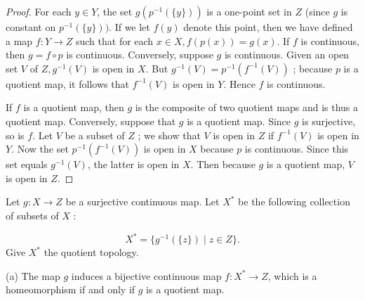 \begin{proof}
 For each \(y \in Y\), the set \(g( {p^{-1}( {\{ y\} }) })\) is a one-point set in \(Z\) (since \(g\) is constant on \(p^{-1}( {\{ y\} }) )\). If we let \(f( y)\) denote this point, then we have defined a map \(f : Y \rightarrow Z\) such that for each \(x \in X,f( {p(x) }) = g(x)\). If \(f\) is continuous, then \(g = f \circ p\) is continuous. Conversely, suppose \(g\) is continuous. Given an open set \(V\) of \(Z,g^{-1}( V)\) is open in \(X\). But \(g^{-1}( V) = p^{-1}( {f^{-1}( V) })\) ; because \(p\) is a quotient map, it follows that \(f^{-1}( V)\) is open in \(Y\). Hence \(f\) is continuous.

 If \(f\) is a quotient map, then \(g\) is the composite of two quotient maps and is thus a quotient map. Conversely, suppose that \(g\) is a quotient map. Since \(g\) is surjective, so is \(f\). Let \(V\) be a subset of \(Z\) ; we show that \(V\) is open in \(Z\) if \(f^{-1}( V)\) is open in \(Y\). Now the set \(p^{-1}( {f^{-1}( V) })\) is open in \(X\) because \(p\) is continuous. Since this set equals \(g^{-1}( V)\), the latter is open in \(X\). Then because \(g\) is a quotient map, \(V\) is open in \(Z\).
\end{proof}

\begin{corollary}
\label{cor:\thetheorem}
 Let \(g : X \rightarrow Z\) be a surjective continuous map. Let \(X^{ * }\) be the following collection of subsets of \(X\) :

 \[
 X^{ * } = \{ {g^{-1}( {\{ z\} }) \mid z \in Z}\}.
 \]
 Give \(X^{ * }\) the quotient topology.
\end{corollary}

(a) The map \(g\) induces a bijective continuous map \(f : X^{ * } \rightarrow Z\), which is a homeomorphism if and only if \(g\) is a quotient map.

\par\nopagebreak
\begin{center}
	\label{fig:com_22_3}
\end{center}
\par\nopagebreak

